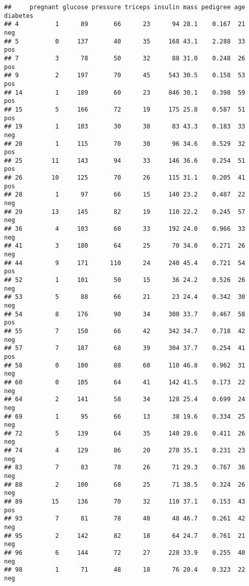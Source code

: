 \documentclass[
]{article}
\begin{document}
\begin{verbatim}
##     pregnant glucose pressure triceps insulin mass pedigree age diabetes
## 4          1      89       66      23      94 28.1    0.167  21      neg
## 5          0     137       40      35     168 43.1    2.288  33      pos
## 7          3      78       50      32      88 31.0    0.248  26      pos
## 9          2     197       70      45     543 30.5    0.158  53      pos
## 14         1     189       60      23     846 30.1    0.398  59      pos
## 15         5     166       72      19     175 25.8    0.587  51      pos
## 19         1     103       30      38      83 43.3    0.183  33      neg
## 20         1     115       70      30      96 34.6    0.529  32      pos
## 25        11     143       94      33     146 36.6    0.254  51      pos
## 26        10     125       70      26     115 31.1    0.205  41      pos
## 28         1      97       66      15     140 23.2    0.487  22      neg
## 29        13     145       82      19     110 22.2    0.245  57      neg
## 36         4     103       60      33     192 24.0    0.966  33      neg
## 41         3     180       64      25      70 34.0    0.271  26      neg
## 44         9     171      110      24     240 45.4    0.721  54      pos
## 52         1     101       50      15      36 24.2    0.526  26      neg
## 53         5      88       66      21      23 24.4    0.342  30      neg
## 54         8     176       90      34     300 33.7    0.467  58      pos
## 55         7     150       66      42     342 34.7    0.718  42      neg
## 57         7     187       68      39     304 37.7    0.254  41      pos
## 58         0     100       88      60     110 46.8    0.962  31      neg
## 60         0     105       64      41     142 41.5    0.173  22      neg
## 64         2     141       58      34     128 25.4    0.699  24      neg
## 69         1      95       66      13      38 19.6    0.334  25      neg
## 72         5     139       64      35     140 28.6    0.411  26      neg
## 74         4     129       86      20     270 35.1    0.231  23      neg
## 83         7      83       78      26      71 29.3    0.767  36      neg
## 88         2     100       68      25      71 38.5    0.324  26      neg
## 89        15     136       70      32     110 37.1    0.153  43      pos
## 93         7      81       78      40      48 46.7    0.261  42      neg
## 95         2     142       82      18      64 24.7    0.761  21      neg
## 96         6     144       72      27     228 33.9    0.255  40      neg
## 98         1      71       48      18      76 20.4    0.323  22      neg

\end{verbatim}
\end{document}

